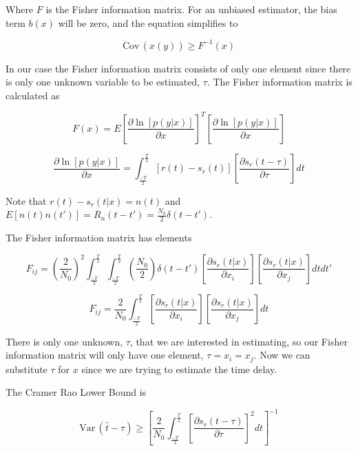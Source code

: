 \documentclass[11pt]{article}
\def\Var{{\textrm{Var}}\,}
\def\Cov{{\textrm{Cov}}\,}
\begin{document}
Where $F$ is the Fisher information matrix. For an unbiased estimator, the bias term $b(x)$ will be zero, and the equation simplifies to

\begin{equation}
\Cov(\hat{x}(y))
\geq
F^{-1}(x)
\end{equation}

In our case the Fisher information matrix consists of only one element since there is only one unknown variable to be estimated, $\tau$. The Fisher information matrix is calculated as

\begin{equation}
F(x) = E\left[ \frac{\partial \ln [p(y|x)]}{\partial x} \right]^T
\left[ \frac{\partial \ln [p(y|x)]}{\partial x} \right]
\end{equation}

\begin{equation}
\frac{\partial \ln [p(y|x)]}{\partial x} 
=
\int^\frac{T}{2}_\frac{-T}{2}
\left[ r(t) - s_r(t) \right]
\left[ \frac{\partial s_r(t-\tau)}{\partial \tau} \right] dt
\end{equation}

Note that $r(t) - s_r(t|x) = n(t)$ and $E[n(t)n(t')]=R_n(t-t')=\frac{N_0}{2}\delta(t-t')$.


The Fisher information matrix has elements

\begin{equation}
F_{ij}
=
\left( \frac{2}{N_0} \right)^2
\int^\frac{T}{2}_\frac{-T}{2} \int^\frac{T}{2}_\frac{-T}{2}
\left( \frac{N_0}{2} \right)
\delta (t - t')
\left[ \frac{\partial s_r(t|x)}{\partial x_i} \right]
\left[ \frac{\partial s_r(t|x)}{\partial x_j} \right]
dt dt'
\end{equation}

\begin{equation}
F_{ij}
=
\frac{2}{N_0}
\int^\frac{T}{2}_\frac{-T}{2}
\left[ \frac{\partial s_r(t|x)}{\partial x_i} \right]
\left[ \frac{\partial s_r(t|x)}{\partial x_j} \right]
dt
\end{equation}

There is only one unknown, $\tau$, that we are interested in estimating, so our Fisher information matrix will only have one element, $\tau = x_i = x_j$. Now we can substitute $\tau$ for $x$ since we are trying to estimate the time delay.


The Cramer Rao Lower Bound is

\begin{equation}
\Var(\hat{t} - \tau)
\geq
\left[
\frac{2}{N_0}
\int^\frac{T}{2}_\frac{-T}{2} \left[ \frac{\partial s_r(t-\tau)}{\partial \tau} \right]^2 dt \right]^{-1}
\end{equation}
\end{document}
